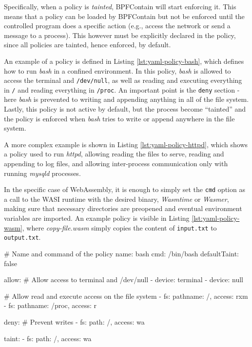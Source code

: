 Specifically, when a policy is \textit{tainted}, BPFContain will start enforcing it. This means that a policy
can be loaded by BPFContain but not be enforced until the controlled program does a specific
action (e.g., access the network or send a message to a process).
This however must be explicitly declared in the policy, since all policies are tainted, hence enforced, by default.

An example of a policy is defined in Listing \ref{lst:yaml-policy-bash}, which defines how to
run \textit{bash} in a confined environment.
In this policy, \textit{bash} is allowed to access the terminal and \texttt{/dev/null}, as well
as reading and executing everything in \texttt{/} and reading everything in \texttt{/proc}.
An important point is the \texttt{deny} section - here \textit{bash} is prevented to writing and
appending anything in all of the file system.
Lastly, this policy is not active by default, but the process become ``tainted'' and the policy is enforced
when \textit{bash} tries to write or append anywhere in the file system.

A more complex example is shown in Listing \ref{lst:yaml-policy-httpd}, which shows a policy
used to run \textit{httpd}, allowing reading the files to serve, reading and appending to log files,
and allowing inter-process communication only with running \textit{mysqld} processes.

In the specific case of WebAssembly, it is enough to simply set the \texttt{cmd} option as
a call to the WASI runtime with the desired binary, \textit{Wasmtime} or \textit{Wasmer}, making sure that
necessary directories are preopened and eventual environment variables are imported.
An example policy is visible in Listing \ref{lst:yaml-policy-wasm}, where \textit{copy-file.wasm} simply copies
the content of \texttt{input.txt} to \texttt{output.txt}.

\vspace*{0.5cm}
\begin{code}[language=yaml, caption=A policy for running bash., label=lst:yaml-policy-bash]
# Name and command of the policy
name: bash
cmd: /bin/bash
defaultTaint: false

allow:
  # Allow access to terminal and /dev/null
  - device: terminal
  - device: null

  # Allow read and execute access on the file system
  - fs: {pathname: /, access: rxm}
  - fs: {pathname: /proc, access: r}

deny:
  # Prevent writes
  - fs: {path: /, access: wa}

taint:
  - fs: {path: /, access: wa}
\end{code}

